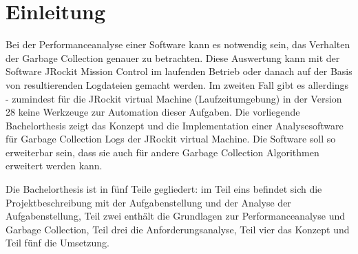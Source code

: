 \chapter*{Einleitung}
Bei der Performanceanalyse einer Software kann es notwendig sein, das  Verhalten der Garbage Collection genauer zu betrachten. Diese Auswertung kann mit der Software JRockit Mission Control im laufenden Betrieb oder danach auf der Basis von resultierenden Logdateien gemacht werden. Im zweiten Fall gibt es allerdings - zumindest für die JRockit virtual Machine (Laufzeitumgebung) in der Version 28 keine Werkzeuge zur Automation dieser Aufgaben. Die vorliegende Bachelorthesis zeigt das Konzept und die Implementation einer Analysesoftware für Garbage Collection Logs der JRockit virtual Machine. Die Software soll so erweiterbar sein, dass sie auch für andere Garbage Collection Algorithmen erweitert werden kann.

Die Bachelorthesis ist in fünf Teile gegliedert: im Teil eins befindet sich die Projektbeschreibung mit der Aufgabenstellung und der Analyse der Aufgabenstellung, Teil zwei enthält die Grundlagen zur Performanceanalyse und Garbage Collection, Teil drei die Anforderungsanalyse, Teil vier das Konzept und Teil fünf die Umsetzung.
